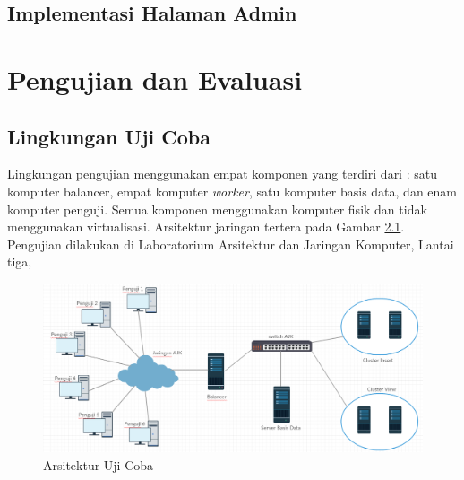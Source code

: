 \documentclass{ta-its}
\begin{document}
		\section{Implementasi Halaman Admin}
	
	\chapter{Pengujian dan Evaluasi}
		\section{Lingkungan Uji Coba}
			Lingkungan pengujian menggunakan empat komponen yang terdiri dari : satu komputer balancer, empat komputer \textit{worker}, satu komputer basis data, dan enam komputer penguji. Semua komponen menggunakan komputer fisik dan tidak menggunakan virtualisasi. Arsitektur jaringan tertera pada Gambar \ref{gambarArsitekturUjiCoba}. Pengujian dilakukan di Laboratorium Arsitektur dan Jaringan Komputer, Lantai tiga, 
			
			\begin{figure}[h] %
				\centering
				\includegraphics[width=\linewidth]{contoh_img/arsitekturujicoba}
				\caption{Arsitektur Uji Coba}
				\label{gambarArsitekturUjiCoba}
			\end{figure}
			
\end{document}
